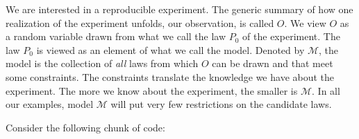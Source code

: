 \documentclass[]{article}
\newenvironment{Shaded}{\begin{snugshade}}{\end{snugshade}}
\newcommand{\ControlFlowTok}[1]{\textcolor[rgb]{0.13,0.29,0.53}{\textbf{#1}}}
\newcommand{\DataTypeTok}[1]{\textcolor[rgb]{0.13,0.29,0.53}{#1}}
\newcommand{\DecValTok}[1]{\textcolor[rgb]{0.00,0.00,0.81}{#1}}
\newcommand{\KeywordTok}[1]{\textcolor[rgb]{0.13,0.29,0.53}{\textbf{#1}}}
\newcommand{\NormalTok}[1]{#1}
\newcommand{\OperatorTok}[1]{\textcolor[rgb]{0.81,0.36,0.00}{\textbf{#1}}}
\newcommand{\OtherTok}[1]{\textcolor[rgb]{0.56,0.35,0.01}{#1}}
\newcommand{\StringTok}[1]{\textcolor[rgb]{0.31,0.60,0.02}{#1}}
\newcommand{\calM}{\mathcal{M}}
\theoremstyle{definition}
\theoremstyle{definition}
\theoremstyle{definition}
\theoremstyle{remark}
\begin{document}
We are interested in a reproducible experiment. The generic summary of
how one realization of the experiment unfolds, our observation, is
called \(O\). We view \(O\) as a random variable drawn from what we call
the law \(P_{0}\) of the experiment. The law \(P_{0}\) is viewed as an
element of what we call the model. Denoted by \(\calM\), the model is
the collection of \textit{all} laws from which \(O\) can be drawn and
that meet some constraints. The constraints translate the knowledge we
have about the experiment. The more we know about the experiment, the
smaller is \(\calM\). In all our examples, model \(\calM\) will put very
few restrictions on the candidate laws.

Consider the following chunk of code:

\begin{Shaded}
\end{Shaded}
\end{document}
